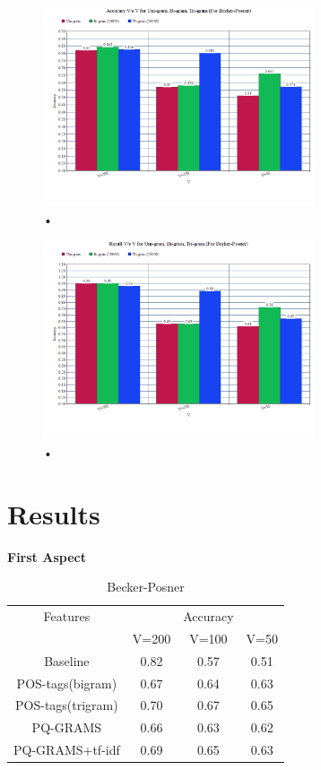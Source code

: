 \documentclass[letterpaper]{article}
\begin{document}
\begin{figure}[H]
\caption{•}
\includegraphics[width=8cm]{4.png}
\end{figure}
\begin{figure}[H]
\caption{•}
\includegraphics[width=8cm]{1.png}
\end{figure}
\section{Results}
\textbf{First Aspect}
\begin {table}[H]
\caption {Becker-Posner} \label{tab:title} 
\begin{center}
 \begin{tabular}{||c c c c||}
 \hline
 Features & & Accuracy \\ [0.5ex]
     & V=200 & V=100 & V=50\\ 
 \hline\hline
 Baseline & 0.82 & 0.57 & 0.51\\ 
 \hline
 POS-tags(bigram) & 0.67 & 0.64 & 0.63\\
 \hline
 POS-tags(trigram) & 0.70 & 0.67 & 0.65\\
 \hline
 PQ-GRAMS & 0.66 & 0.63 & 0.62\\
 \hline
 PQ-GRAMS+tf-idf & 0.69 & 0.65 & 0.63\\ [1ex] 
 \hline
\end{tabular}
\end{center}
\end{table}
\end{document}
